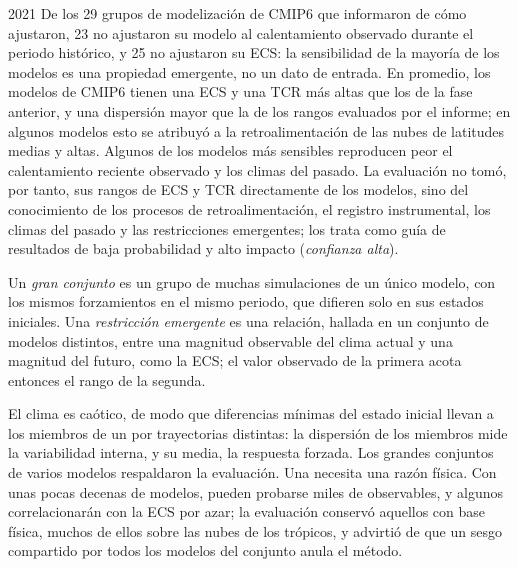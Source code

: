 \begin{dated}{2021}
De los 29 grupos de modelización de CMIP6 que informaron de cómo ajustaron, 23 no
ajustaron su modelo al calentamiento observado durante el periodo histórico, y
25 no ajustaron su ECS: la sensibilidad de la mayoría de los modelos es una
propiedad emergente, no un dato de entrada. En promedio, los modelos de CMIP6 tienen una ECS y una TCR más altas que los
de la fase anterior, y una dispersión mayor que la de los rangos evaluados por el
informe; en algunos modelos esto se atribuyó a la retroalimentación de
las nubes de latitudes medias y altas. Algunos de los modelos más sensibles
reproducen peor el calentamiento reciente observado y los climas del pasado.
La evaluación no tomó, por tanto, sus rangos de ECS y TCR directamente de los
modelos, sino del conocimiento de los procesos de retroalimentación,
el registro instrumental, los climas del pasado y las restricciones emergentes; los trata como guía de
resultados de baja probabilidad y alto impacto (\emph{confianza alta}).
\end{dated}

\begin{definition}\label{def:b3:climate-models:evaluation}
Un \emph{gran conjunto} es un grupo de muchas simulaciones
de un único modelo, con los mismos forzamientos en el mismo periodo, que difieren
solo en sus estados iniciales. Una \emph{restricción
emergente} es una relación, hallada en un
conjunto de modelos distintos, entre una magnitud observable del
clima actual y una magnitud del futuro, como la ECS; el
valor observado de la primera acota entonces el rango de la segunda.
\end{definition}

El clima es caótico, de modo que diferencias mínimas del estado inicial llevan a los
miembros de un  por trayectorias distintas: la dispersión de los
miembros mide la variabilidad interna, y su media, la respuesta
forzada. Los grandes conjuntos de varios modelos respaldaron la evaluación. Una
 necesita una razón física. Con unas pocas decenas de modelos,
pueden probarse miles de observables, y algunos correlacionarán con la
ECS por azar; la evaluación conservó aquellos con base física, muchos de
ellos sobre las nubes de los trópicos, y advirtió de que un sesgo compartido por todos
los modelos del conjunto anula el método.

